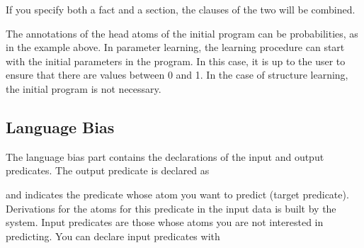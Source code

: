 \documentclass[letterpaper,10pt,english]{sphinxmanual}
\begin{document}
\begin{sphinxVerbatim}[commandchars=\\\{\}]
 

 
 
 

 
\end{sphinxVerbatim}

\sphinxAtStartPar
If you specify both a  fact and a section, the clauses of the two will be combined.

\sphinxAtStartPar
The annotations of the head atoms of the initial program can be probabilities, as in the example above. In parameter learning, the learning procedure can start with the initial parameters in the program. In this case, it is up to the user to ensure that there are values between 0 and 1. In the case of structure learning, the initial program is not necessary.


\subsection{Language Bias}
\label{\detokenize{index:language-bias}}
\sphinxAtStartPar
The language bias part contains the declarations of the input and output predicates.
The output predicate is declared as

\begin{sphinxVerbatim}[commandchars=\\\{\}]
\end{sphinxVerbatim}

\sphinxAtStartPar
and indicates the predicate whose atom you want to predict (target predicate).
Derivations for the atoms for this predicate in the input data is built by the system.
Input predicates are those whose atoms you are not interested in predicting.
You can declare input predicates with
\end{document}
